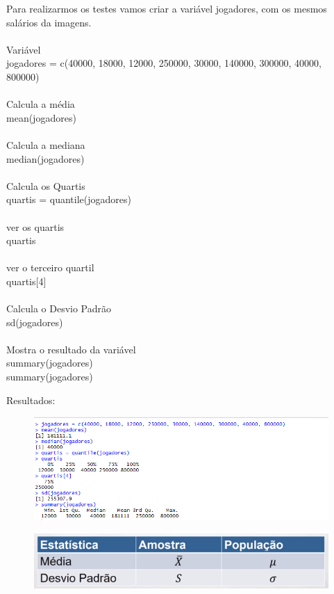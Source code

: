 Para realizarmos os testes vamos criar a variável jogadores, com os mesmos salários da 
imagens.
\\\\Variável
\\jogadores = c(40000, 18000, 12000, 250000, 30000, 140000, 300000, 40000, 800000)\\
\\Calcula a média
\\mean(jogadores)
\\\\Calcula a mediana
\\median(jogadores)
\\\\Calcula os Quartis 
\\quartis = quantile(jogadores)
\\\\ver os quartis 
\\quartis
\\\\ver o terceiro quartil 
\\quartis[4]
\\\\Calcula o Desvio Padrão
\\sd(jogadores)
\\\\Mostra o resultado da variável 
\\summary(jogadores)
\\summary(jogadores)

\newpage
Resultados:

	\begin{figure}[h!]	
	\includegraphics[scale=0.90]{cap2/MedidasCentralidadeVariabilidade/MedidasCentralidadeVariabilidadeR.png}
	\end{figure}

	\begin{figure}[h!]	
	\includegraphics[scale=0.90]{cap2/MedidasCentralidadeVariabilidade/AmostraEPopulacao.png}
	\end{figure}

